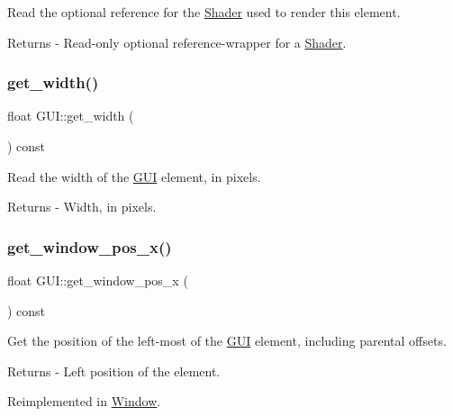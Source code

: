 Read the optional reference for the \mbox{\hyperlink{class_shader}{Shader}} used to render this element. \begin{DoxyReturn}{Returns}
-\/ Read-\/only optional reference-\/wrapper for a \mbox{\hyperlink{class_shader}{Shader}}. 
\end{DoxyReturn}
\mbox{\label{class_g_u_i_a3606efd6a6db43f9751110d41ec195a3}} 
\subsubsection{\texorpdfstring{get\+\_\+width()}{get\_width()}}
{\footnotesize\ttfamily float G\+U\+I\+::get\+\_\+width (\begin{DoxyParamCaption}{ }\end{DoxyParamCaption}) const\hspace{0.3cm}{\ttfamily [virtual]}}

Read the width of the \mbox{\hyperlink{class_g_u_i}{G\+UI}} element, in pixels. \begin{DoxyReturn}{Returns}
-\/ Width, in pixels. 
\end{DoxyReturn}
\mbox{\label{class_g_u_i_abbad56adda65a7176a4e0c7e260d9449}} 
\subsubsection{\texorpdfstring{get\+\_\+window\+\_\+pos\+\_\+x()}{get\_window\_pos\_x()}}
{\footnotesize\ttfamily float G\+U\+I\+::get\+\_\+window\+\_\+pos\+\_\+x (\begin{DoxyParamCaption}{ }\end{DoxyParamCaption}) const\hspace{0.3cm}{\ttfamily [virtual]}}

Get the position of the left-\/most of the \mbox{\hyperlink{class_g_u_i}{G\+UI}} element, including parental offsets. \begin{DoxyReturn}{Returns}
-\/ Left position of the element. 
\end{DoxyReturn}


Reimplemented in \mbox{\hyperlink{class_window_ab2af2ee909ac87876fd043acfe7611ca}{Window}}.

